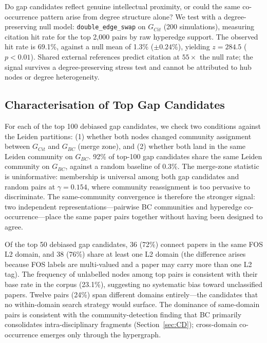 Do gap candidates reflect genuine intellectual proximity, or could the same co-occurrence pattern arise from degree structure alone? We test with a degree-preserving null model: \texttt{double\_edge\_swap} on $G_{Cit}$ (200 simulations), measuring citation hit rate for the top 2,000 pairs by raw hyperedge support.
The observed hit rate is 69.1\%, against a null mean of 1.3\% ($\pm 0.24\%$), yielding $z = 284.5$ ($p < 0.01$). Shared external references predict citation at $55{\times}$ the null rate; the signal survives a degree-preserving stress test and cannot be attributed to hub nodes or degree heterogeneity.


\subsection{Characterisation of Top Gap Candidates}
\label{subsec:hg:characterisation}

For each of the top 100 debiased gap candidates, we check two conditions against the Leiden partitions: (1) whether both nodes changed community assignment between $G_{Cit}$ and $G_{BC}$ (merge zone), and (2) whether both land in the same Leiden community on $G_{BC}$. 92\% of top-100 gap candidates share the same Leiden community on $G_{BC}$, against a random baseline of 0.3\%.
The merge-zone statistic is uninformative: membership is universal among both gap candidates and random pairs at $\gamma = 0.154$, where community reassignment is too pervasive to discriminate. The same-community convergence is therefore the stronger signal: two independent representations---pairwise BC communities and hyperedge co-occurrence---place the same paper pairs together without having been designed to agree.

Of the top 50 debiased gap candidates, 36 (72\%) connect papers in the same FOS L2 domain, and 38 (76\%) share at least one L2 domain (the difference arises because FOS labels are multi-valued and a paper may carry more than one L2 tag). The frequency of unlabelled nodes among top pairs is consistent with their base rate in the corpus (23.1\%), suggesting no systematic bias
toward unclassified papers. Twelve pairs (24\%) span different domains entirely---the candidates that no within-domain search strategy would surface.
The dominance of same-domain pairs is consistent with the community-detection finding that BC primarily consolidates intra-disciplinary fragments (Section~\ref{sec:CD}); cross-domain co-occurrence emerges only through the hypergraph.


